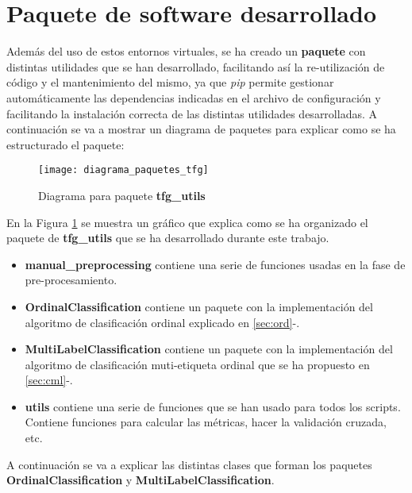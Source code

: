 \section{Paquete de software desarrollado}
Además del uso de estos entornos virtuales, se ha creado un \textbf{paquete} con distintas utilidades que se han desarrollado, facilitando así la re-utilización de código y el mantenimiento del mismo, ya que \textit{pip} permite gestionar automáticamente las dependencias indicadas en el archivo de configuración y facilitando la instalación correcta de las distintas utilidades desarrolladas.
A continuación se va a mostrar un diagrama de paquetes para explicar como se ha estructurado el paquete:
\begin{figure}[H]
    \centering
    \texttt{[image: diagrama\_paquetes\_tfg]}
    \caption{Diagrama para paquete \textbf{tfg\_utils}}
    \label{dig:paquetes_tfg}
\end{figure}
En la Figura \ref{dig:paquetes_tfg} se muestra un gráfico que explica como se ha organizado el paquete de \textbf{tfg\_utils} que se ha desarrollado durante este trabajo.
\begin{itemize}
    \item \textbf{manual\_preprocessing} contiene una serie de funciones usadas en la fase de pre-procesamiento.
    \item \textbf{OrdinalClassification} contiene un paquete con la implementación del algoritmo de clasificación ordinal explicado en \ref{sec:ord}-.
    \item \textbf{MultiLabelClassification} contiene un paquete con la implementación del algoritmo de clasificación muti-etiqueta ordinal que se ha propuesto en \ref{sec:cml}-.
    \item \textbf{utils} contiene una serie de funciones que se han usado para todos los scripts. Contiene funciones para calcular las métricas, hacer la validación cruzada, etc.
\end{itemize}
A continuación se va a explicar las distintas clases que forman los paquetes \textbf{OrdinalClassification} y \textbf{MultiLabelClassification}. 
\clearpage
